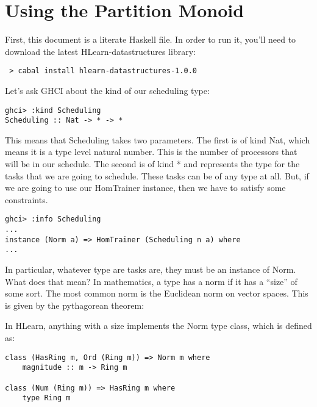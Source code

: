 \documentclass[tikz]{tmr}
\newcommand\+{\mdoubleplus}
\begin{document}
\section {Using the Partition Monoid}

First, this document is a literate Haskell file.
In order to run it, you'll need to download the latest HLearn-datastructures library:

\begin{verbatim}
 > cabal install hlearn-datastructures-1.0.0
\end{verbatim}

Let's ask GHCI about the kind of our scheduling type:

\begin{lstlisting}
ghci> :kind Scheduling
Scheduling :: Nat -> * -> *
\end{lstlisting}

This means that Scheduling takes two parameters.  
The first is of kind Nat, which means it is a type level natural number.
This is the number of processors that will be in our schedule.
The second is of kind * and represents the type for the tasks that we are going to schedule.
These tasks can be of any type at all.
But, if we are going to use our HomTrainer instance, then we have to satisfy some constraints.

\begin{lstlisting}
ghci> :info Scheduling
...
instance (Norm a) => HomTrainer (Scheduling n a) where
...
\end{lstlisting}

In particular, whatever type are tasks are, they must be an instance of Norm.
What does that mean?
In mathematics, a type has a norm if it has a ``size'' of some sort.
The most common norm is the Euclidean norm on vector spaces.
This is given by the pythagorean theorem:

In HLearn, anything with a size implements the Norm type class, which is defined as:
\begin{lstlisting}
class (HasRing m, Ord (Ring m)) => Norm m where
    magnitude :: m -> Ring m

class (Num (Ring m)) => HasRing m where
    type Ring m
\end{lstlisting}
\end{document}
